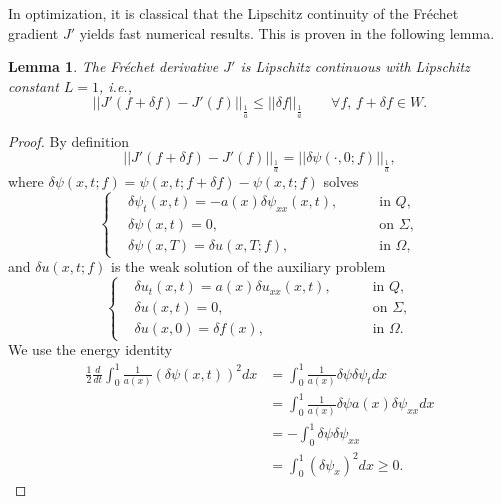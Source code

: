 \documentclass[reqno]{amsart}
\theoremstyle{plain}
\newtheorem{lemma}[theorem]{Lemma}
\theoremstyle{remark}
\numberwithin{equation}{section}
\begin{document}
In optimization, it is classical that the Lipschitz continuity of the Fréchet gradient $J'$ yields fast numerical results. This is proven in the following lemma.
\begin{lemma}
The Fréchet derivative $J'$ is Lipschitz continuous with Lipschitz constant $L=1$, i.e.,
    $$ \vert \vert J'(f + \delta f )-J'(f)\vert\vert_{\frac{1}{a}}\leqslant  \vert \vert \delta f\vert \vert_{\frac{1}{a}} \qquad \forall f,\, f+\delta f \in W.$$
\end{lemma}
\begin{proof}
    By definition 
    $$\vert\vert J'(f+\delta f)-J'(f)\vert\vert_{\frac{1}{a}}=\vert\vert\delta \psi(\cdot,0;f)\vert\vert_{\frac{1}{a}},$$
    where
    $\delta\psi(x,t;f)= \psi(x,t;f+\delta f)-\psi(x,t;f)$ solves
\begin{equation}
    \left\{
\begin{aligned}
& \delta\psi_{t}(x,t) = -a(x) \delta\psi_{xx}(x,t),&&\quad \text { in } Q,\\
& \delta\psi(x,t)=0, &&\quad \text { on } \Sigma,\\
& \delta\psi(x,T)=\delta u(x,T;f), &&\quad \text { in } \Omega,
\label{eq1to7}
\end{aligned}
\right.
\end{equation}
and $\delta u(x,t;f)$ is the weak solution of the auxiliary problem
\begin{equation}
    \left\{
\begin{aligned}
& \delta u_{t}(x,t) = a(x) \delta u_{xx}(x,t),&&\quad \text { in } Q,\\
& \delta u(x,t)=0, &&\quad \text { on } \Sigma,\\
& \delta u(x,0)=\delta f(x), &&\quad \text { in } \Omega.
\label{eq1to8}
\end{aligned}
\right.
\end{equation}
We use the energy identity
\begin{equation*}
    \begin{aligned}
        \frac{1}{2} \frac{d}{dt}\int_{0}^1 \frac{1}{a(x)}\left(\delta \psi(x,t)\right)^2 dx&= \int_{0}^1 \frac{1}{a(x)}\delta \psi \delta \psi_{t} dx\\& =\int_{0}^1 \frac{1}{a(x)}\delta \psi a(x) \delta \psi_{xx} dx\\&= -\int_{0}^1 \delta \psi \delta \psi_{xx}\\&= \int_{0}^1 (\delta \psi_{x})^2 dx \geqslant 0.

\end{aligned}
\end{equation*}
\end{proof}
\end{document}

